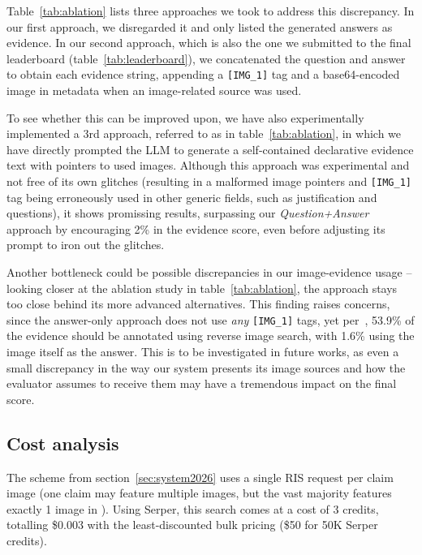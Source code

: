Table~\ref{tab:ablation} lists three approaches we took to address this discrepancy. In our first approach, we disregarded it and only listed the generated answers as \averitec{} evidence. In our second approach, which is also the one we submitted to the final leaderboard (table~\ref{tab:leaderboard}), we concatenated the question and answer to obtain each evidence string, appending a \texttt{[IMG\_1]} tag and a base64-encoded image in metadata when an image-related source was used.

To see whether this can be improved upon, we have also experimentally implemented a 3rd approach, referred to as  in table~\ref{tab:ablation}, in which we have directly prompted the LLM to generate a self-contained declarative evidence text with pointers to used images.
Although this approach was experimental and not free of its own glitches (resulting in a malformed image pointers and \texttt{[IMG\_1]} tag being erroneously used in other generic fields, such as justification and questions), it shows promissing results, surpassing our \textit{Question+Answer} approach by encouraging 2\% in the evidence score, even before adjusting its prompt to iron out the glitches.

Another bottleneck could be possible discrepancies in our image-evidence usage -- looking closer at the ablation study in table~\ref{tab:ablation}, the  approach stays too close behind its more advanced alternatives.
This finding raises concerns, since the answer-only approach does not use \textit{any} \texttt{[IMG\_1]} tags, yet per~\citealt{cao2025averimatecdatasetautomaticverification}, 53.9\% of the \averitec{} evidence should be annotated using reverse image search, with 1.6\% using the image itself as the answer. 
This is to be investigated in future works, as even a small discrepancy in the way our system presents its image sources and how the \averitec{} evaluator assumes to receive them may have a tremendous impact on the final score.


\subsection{Cost analysis}
The scheme from section~\ref{sec:system2026} uses a single RIS request per claim image (one claim may feature multiple images, but the vast majority features exactly 1 image in \averitec{}). Using Serper, this search comes at a cost of 3 credits, totalling \$0.003 with the least-discounted bulk pricing (\$50 for 50K Serper credits).

